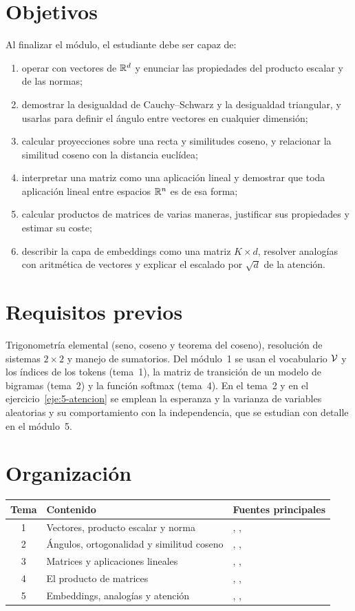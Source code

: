 \documentclass[11pt,a4paper,twoside,openany]{book}
\begin{document}
\section*{Objetivos}
Al finalizar el módulo, el estudiante debe ser capaz de:
\begin{enumerate}[label=\arabic*.]
  \item operar con vectores de $\mathbb{R}^{d}$ y enunciar las propiedades del producto escalar y de las normas;
  \item demostrar la desigualdad de Cauchy--Schwarz y la desigualdad triangular, y usarlas para definir el ángulo entre vectores en cualquier dimensión;
  \item calcular proyecciones sobre una recta y similitudes coseno, y relacionar la similitud coseno con la distancia euclídea;
  \item interpretar una matriz como una aplicación lineal y demostrar que toda aplicación lineal entre espacios $\mathbb{R}^{n}$ es de esa forma;
  \item calcular productos de matrices de varias maneras, justificar sus propiedades y estimar su coste;
  \item describir la capa de embeddings como una matriz $K\times d$, resolver analogías con aritmética de vectores y explicar el escalado por $\sqrt{d}$ de la atención.
\end{enumerate}

\section*{Requisitos previos}
Trigonometría elemental (seno, coseno y teorema del coseno), resolución de sistemas $2\times 2$ y manejo de sumatorios. Del módulo~1 se usan el vocabulario $\mathcal{V}$ y los índices de los tokens (tema~1), la matriz de transición de un modelo de bigramas (tema~2) y la función softmax (tema~4). En el tema~2 y en el ejercicio~\ref{eje:5-atencion} se emplean la esperanza y la varianza de variables aleatorias y su comportamiento con la independencia, que se estudian con detalle en el módulo~5.

\section*{Organización}
\begin{center}
\begin{tabular}{@{}cll@{}}
\toprule
Tema & Contenido & Fuentes principales \\
\midrule
1 & Vectores, producto escalar y norma & \cite{strang}, \cite{mml}, \cite{vmls} \\
2 & Ángulos, ortogonalidad y similitud coseno & \cite{strang}, \cite{mml}, \cite{bhk} \\
3 & Matrices y aplicaciones lineales & \cite{strang}, \cite{mit1806sc}, \cite{mml} \\
4 & El producto de matrices & \cite{strang}, \cite{mit1806sc}, \cite{vmls} \\
5 & Embeddings, analogías y atención & \cite{jm3}, \cite{mikolov-a}, \cite{vaswani} \\
\bottomrule
\end{tabular}
\end{center}
\end{document}
